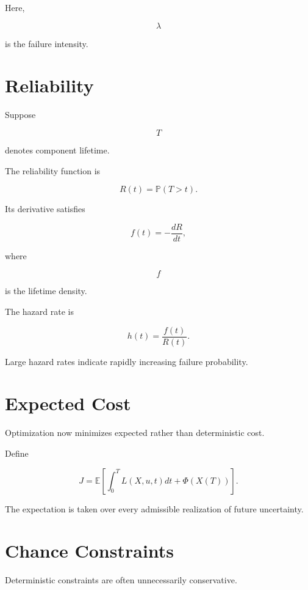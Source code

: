 \documentclass[11pt,fleqn]{book}
\numberwithin{equation}{chapter}
\theoremstyle{plain}
\theoremstyle{definition}
\theoremstyle{remark}
\begin{document}
Here,

\[
\lambda
\]

is the failure intensity.


\section{Reliability}

Suppose

\[
T
\]

denotes component lifetime.

The reliability function is

\[
R(t)
=
\mathbb P(T>t).
\]

Its derivative satisfies

\[
f(t)
=
-
\frac{dR}{dt},
\]

where

\[
f
\]

is the lifetime density.


The hazard rate is

\[
\boxed{
h(t)
=
\frac{f(t)}{R(t)}.
}
\]

Large hazard rates indicate rapidly increasing failure probability.


\section{Expected Cost}

Optimization now minimizes expected rather than deterministic cost.

Define

\[
\boxed{
J
=
\mathbb E
\left[
\int_0^T
L(X,u,t)
dt
+
\Phi(X(T))
\right].
}
\]

The expectation is taken over every admissible realization of future
uncertainty.


\section{Chance Constraints}

Deterministic constraints are often unnecessarily conservative.
\end{document}
